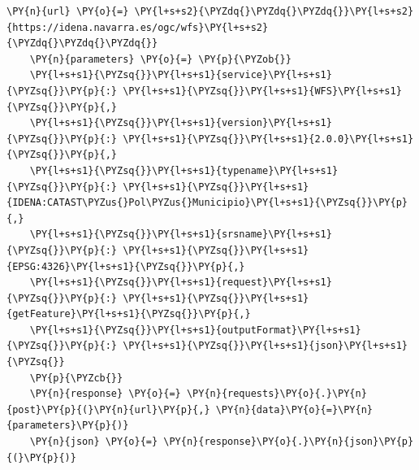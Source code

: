 \begin{itemize}
\begin{enumerate}
\begin{tcolorbox}[breakable, size=fbox, boxrule=1pt, colback=cellbackground, colframe=cellborder, fontupper=\footnotesize]
    \begin{Verbatim}[commandchars=\\\{\}]
    \PY{n}{url} \PY{o}{=} \PY{l+s+s2}{\PYZdq{}\PYZdq{}\PYZdq{}}\PY{l+s+s2}{https://idena.navarra.es/ogc/wfs}\PY{l+s+s2}{\PYZdq{}\PYZdq{}\PYZdq{}}
    \PY{n}{parameters} \PY{o}{=} \PY{p}{\PYZob{}}
    \PY{l+s+s1}{\PYZsq{}}\PY{l+s+s1}{service}\PY{l+s+s1}{\PYZsq{}}\PY{p}{:} \PY{l+s+s1}{\PYZsq{}}\PY{l+s+s1}{WFS}\PY{l+s+s1}{\PYZsq{}}\PY{p}{,}
    \PY{l+s+s1}{\PYZsq{}}\PY{l+s+s1}{version}\PY{l+s+s1}{\PYZsq{}}\PY{p}{:} \PY{l+s+s1}{\PYZsq{}}\PY{l+s+s1}{2.0.0}\PY{l+s+s1}{\PYZsq{}}\PY{p}{,}
    \PY{l+s+s1}{\PYZsq{}}\PY{l+s+s1}{typename}\PY{l+s+s1}{\PYZsq{}}\PY{p}{:} \PY{l+s+s1}{\PYZsq{}}\PY{l+s+s1}{IDENA:CATAST\PYZus{}Pol\PYZus{}Municipio}\PY{l+s+s1}{\PYZsq{}}\PY{p}{,}
    \PY{l+s+s1}{\PYZsq{}}\PY{l+s+s1}{srsname}\PY{l+s+s1}{\PYZsq{}}\PY{p}{:} \PY{l+s+s1}{\PYZsq{}}\PY{l+s+s1}{EPSG:4326}\PY{l+s+s1}{\PYZsq{}}\PY{p}{,}
    \PY{l+s+s1}{\PYZsq{}}\PY{l+s+s1}{request}\PY{l+s+s1}{\PYZsq{}}\PY{p}{:} \PY{l+s+s1}{\PYZsq{}}\PY{l+s+s1}{getFeature}\PY{l+s+s1}{\PYZsq{}}\PY{p}{,}
    \PY{l+s+s1}{\PYZsq{}}\PY{l+s+s1}{outputFormat}\PY{l+s+s1}{\PYZsq{}}\PY{p}{:} \PY{l+s+s1}{\PYZsq{}}\PY{l+s+s1}{json}\PY{l+s+s1}{\PYZsq{}}
    \PY{p}{\PYZcb{}}
    \PY{n}{response} \PY{o}{=} \PY{n}{requests}\PY{o}{.}\PY{n}{post}\PY{p}{(}\PY{n}{url}\PY{p}{,} \PY{n}{data}\PY{o}{=}\PY{n}{parameters}\PY{p}{)}
    \PY{n}{json} \PY{o}{=} \PY{n}{response}\PY{o}{.}\PY{n}{json}\PY{p}{(}\PY{p}{)}
    \end{Verbatim}
\end{tcolorbox}


\end{enumerate}
\end{itemize}
